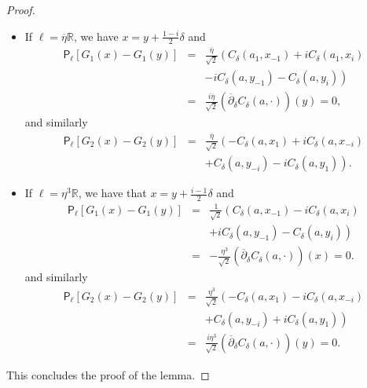 \documentclass[oneside,english]{amsart}
\numberwithin{equation}{section}
\numberwithin{figure}{section}
\theoremstyle{plain}
\theoremstyle{plain}
\theoremstyle{plain}
\theoremstyle{plain}
\theoremstyle{plain}
\theoremstyle{definition}
\theoremstyle{remark}
\begin{document}
\begin{proof}
\begin{itemize}
\item If $\ell=\overline{\eta}\mathbb{R}$, we have $x=y+\frac{1-i}{2}\delta$
and
\begin{eqnarray*}
\mathsf{P}_{\ell}\left[G_{1}\left(x\right)-G_{1}\left(y\right)\right] & = & \frac{\overline{\eta}}{\sqrt{2}}\left(C_{\delta}\left(a_{1},x_{-1}\right)+iC_{\delta}\left(a_{1},x_{i}\right)\right.\\
 &  & \left.-iC_{\delta}\left(a,y_{-1}\right)-C_{\delta}\left(a,y_{i}\right)\right)\\
 & = & \frac{i\overline{\eta}}{\sqrt{2}}\left(\overline{\partial}_{\delta}C_{\delta}\left(a,\cdot\right)\right)\left(y\right)=0,
\end{eqnarray*}
and similarly
\begin{eqnarray*}
\mathsf{P}_{\ell}\left[G_{2}\left(x\right)-G_{2}\left(y\right)\right] & = & \frac{\overline{\eta}}{\sqrt{2}}\left(-C_{\delta}\left(a,x_{1}\right)+iC_{\delta}\left(a,x_{-i}\right)\right.\\
 &  & \left.+C_{\delta}\left(a,y_{-i}\right)-iC_{\delta}\left(a,y_{1}\right)\right).
\end{eqnarray*}
 
\item If $\ell=\eta^{3}\mathbb{R}$, we have that $x=y+\frac{i-1}{2}\delta$
and
\begin{eqnarray*}
\mathsf{P}_{\ell}\left[G_{1}\left(x\right)-G_{1}\left(y\right)\right] & = & \frac{1}{\sqrt{2}}\left(C_{\delta}\left(a,x_{-1}\right)-iC_{\delta}\left(a,x_{i}\right)\right.\\
 &  & \left.+iC_{\delta}\left(a,y_{-1}\right)-C_{\delta}\left(a,y_{i}\right)\right)\\
 & = & -\frac{\eta^{3}}{\sqrt{2}}\left(\overline{\partial}_{\delta}C_{\delta}\left(a,\cdot\right)\right)\left(x\right)=0.
\end{eqnarray*}
and similarly
\begin{eqnarray*}
\mathsf{P}_{\ell}\left[G_{2}\left(x\right)-G_{2}\left(y\right)\right] & = & \frac{\eta^{3}}{\sqrt{2}}\left(-C_{\delta}\left(a,x_{1}\right)-iC_{\delta}\left(a,x_{-i}\right)\right.\\
 &  & \left.+C_{\delta}\left(a,y_{-i}\right)+iC_{\delta}\left(a,y_{1}\right)\right)\\
 & = & \frac{i\eta^{3}}{\sqrt{2}}\left(\overline{\partial}_{\delta}C_{\delta}\left(a,\cdot\right)\right)\left(y\right)=0.
\end{eqnarray*}

\end{itemize}
This concludes the proof of the lemma. 
\end{proof}
\end{document}
